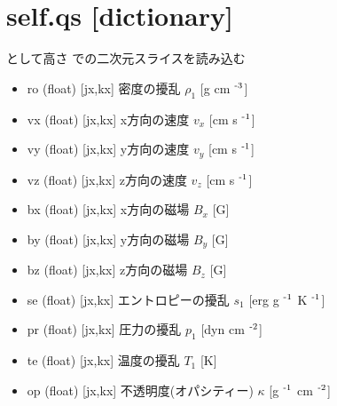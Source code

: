 \documentclass[letterpaper,10pt,dvipdfmx,report]{sphinxmanual}
\begin{document}
\section{self.qs {[}dictionary{]}}
\label{\detokenize{notation:self-qs-dictionary}}
\begin{sphinxVerbatim}[commandchars=\\\{\}]
  
  
\end{sphinxVerbatim}

\sphinxAtStartPar
として高さ  での二次元スライスを読み込む
\begin{itemize}
\item {} 
\sphinxAtStartPar
ro (float) {[}jx,kx{]} \sphinxhyphen{}\sphinxhyphen{} 密度の擾乱 \(\rho_1\) {[}g cm $^{\text{\mbox{-}3}}${]}

\item {} 
\sphinxAtStartPar
vx (float) {[}jx,kx{]} \sphinxhyphen{}\sphinxhyphen{} x方向の速度 \(v_x\) {[}cm s $^{\text{\mbox{-}1}}${]}

\item {} 
\sphinxAtStartPar
vy (float) {[}jx,kx{]} \sphinxhyphen{}\sphinxhyphen{} y方向の速度 \(v_y\) {[}cm s $^{\text{\mbox{-}1}}${]}

\item {} 
\sphinxAtStartPar
vz (float) {[}jx,kx{]} \sphinxhyphen{}\sphinxhyphen{} z方向の速度 \(v_z\) {[}cm s $^{\text{\mbox{-}1}}${]}

\item {} 
\sphinxAtStartPar
bx (float) {[}jx,kx{]} \sphinxhyphen{}\sphinxhyphen{} x方向の磁場 \(B_x\) {[}G{]}

\item {} 
\sphinxAtStartPar
by (float) {[}jx,kx{]} \sphinxhyphen{}\sphinxhyphen{} y方向の磁場 \(B_y\) {[}G{]}

\item {} 
\sphinxAtStartPar
bz (float) {[}jx,kx{]} \sphinxhyphen{}\sphinxhyphen{} z方向の磁場 \(B_z\) {[}G{]}

\item {} 
\sphinxAtStartPar
se (float) {[}jx,kx{]} \sphinxhyphen{}\sphinxhyphen{} エントロピーの擾乱 \(s_1\) {[}erg g $^{\text{\mbox{-}1}}$ K $^{\text{\mbox{-}1}}${]}

\item {} 
\sphinxAtStartPar
pr (float) {[}jx,kx{]} \sphinxhyphen{}\sphinxhyphen{} 圧力の擾乱 \(p_1\) {[}dyn cm $^{\text{\mbox{-}2}}${]}

\item {} 
\sphinxAtStartPar
te (float) {[}jx,kx{]} \sphinxhyphen{}\sphinxhyphen{} 温度の擾乱 \(T_1\) {[}K{]}

\item {} 
\sphinxAtStartPar
op (float) {[}jx,kx{]} \sphinxhyphen{}\sphinxhyphen{} 不透明度(オパシティー) \(\kappa\) {[}g $^{\text{\mbox{-}1}}$ cm $^{\text{\mbox{-}2}}${]}

\end{itemize}
\end{document}

